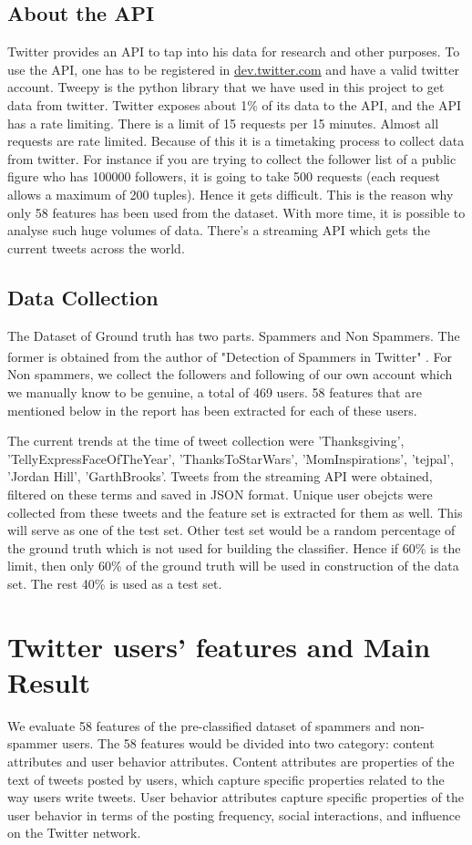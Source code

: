 \documentclass[11pt]{article}
\newcommand{\scite}[1]{\textsuperscript{\cite{#1}}} %
\begin{document}
\subsection{About the API}
Twitter provides an API to tap into his data for research and other purposes. To use the API, one has to be registered in \url{dev.twitter.com} and have a valid twitter account. Tweepy is the python library that we have used in this project to get data from twitter. Twitter exposes about 1\% of its data to the API, and the API has a rate limiting. There is a limit of 15 requests per 15 minutes. Almost all requests are rate limited. Because of this it is a timetaking process to collect data from twitter. For instance if you are trying to collect the follower list of a public figure who has 100000 followers, it is going to take 500 requests (each request allows a maximum of 200 tuples). Hence it gets difficult. This is the reason why only 58 features has been used from the dataset. With more time, it is possible to analyse such huge volumes of data. There's a streaming API which gets the current tweets across the world.

\subsection{Data Collection}
The Dataset of Ground truth has two parts. Spammers and Non Spammers. The former is obtained from the author of "Detection of Spammers in Twitter" \scite{1}. For Non spammers, we collect the followers and following of our own account which we manually know to be genuine, a total of 469 users. 58 features that are mentioned below in the report has been extracted for each of these users. 

The current trends at the time of tweet collection were 'Thanksgiving', 'TellyExpressFaceOfTheYear', 'ThanksToStarWars', 'MomInspirations', 'tejpal', 'Jordan Hill', 'GarthBrooks'. Tweets from the streaming API were obtained, filtered on these terms and saved in JSON format. Unique user obejcts were collected from these tweets and the feature set is extracted for them as well. This will serve as one of the test set. Other test set would be a random percentage of the ground truth which is not used for building the classifier. Hence if 60\% is the limit, then only 60\% of the ground truth will be used in construction of the data set. The rest 40\% is used as a test set. 

\section{Twitter users' features and Main Result}
We evaluate 58 features of the pre-classified dataset of spammers and non-spammer users. The 58 features would be divided into two category: content attributes and user behavior attributes. Content attributes are properties of the text of tweets posted by users, which capture specific properties related to the way users write tweets. User behavior attributes capture specific properties of the user behavior in terms of the posting frequency, social interactions, and influence on the Twitter network. 
\end{document}
